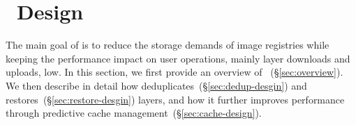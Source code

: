 \section{\sysname~Design}
\label{sec:Sift}

The main goal of \sysname is to reduce the storage demands of image registries
while keeping the performance impact on user operations, mainly layer downloads
and uploads, low.
%
In this section, we first provide an overview of
\sysname~(\S\ref{sec:overview}).
%
We then describe in detail how \sysname deduplicates~(\S\ref{sec:dedup-desgin})
and restores~(\S\ref{sec:restore-desgin}) layers, and how it further improves
performance through predictive cache management~(\S\ref{sec:cache-design}).








